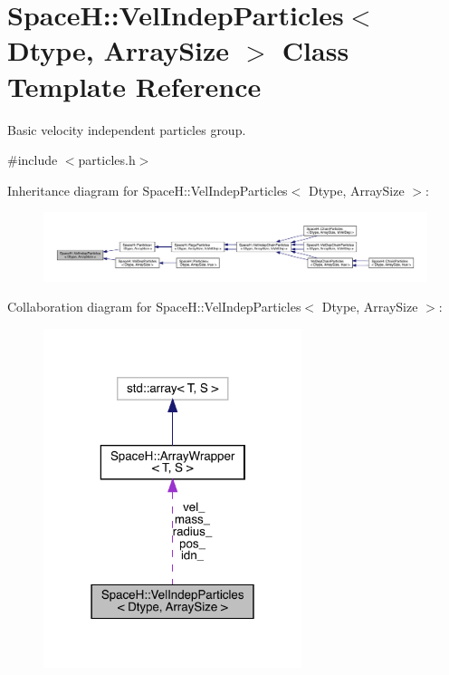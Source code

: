 \hypertarget{class_space_h_1_1_vel_indep_particles}{}\section{SpaceH\+:\+:Vel\+Indep\+Particles$<$ Dtype, Array\+Size $>$ Class Template Reference}
\label{class_space_h_1_1_vel_indep_particles}


Basic velocity independent particles group.  




{\ttfamily \#include $<$particles.\+h$>$}



Inheritance diagram for SpaceH\+:\+:Vel\+Indep\+Particles$<$ Dtype, Array\+Size $>$\+:
\nopagebreak
\begin{figure}[H]
\begin{center}
\leavevmode
\includegraphics[width=350pt]{class_space_h_1_1_vel_indep_particles__inherit__graph}
\end{center}
\end{figure}


Collaboration diagram for SpaceH\+:\+:Vel\+Indep\+Particles$<$ Dtype, Array\+Size $>$\+:
\nopagebreak
\begin{figure}[H]
\begin{center}
\leavevmode
\includegraphics[width=214pt]{class_space_h_1_1_vel_indep_particles__coll__graph}
\end{center}
\end{figure}
